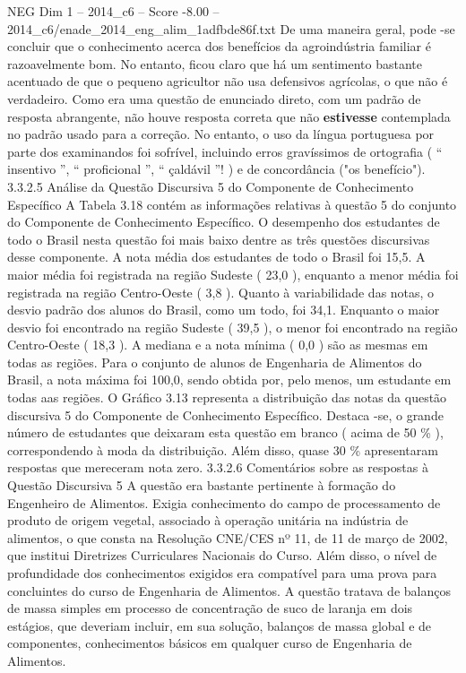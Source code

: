 \begin{textsample}{NEG Dim 1 – 2014\_c6 – Score -8.00 – 2014\_c6/enade\_2014\_eng\_alim\_1adfbde86f.txt}
De uma maneira geral, pode -se concluir que o conhecimento acerca dos benefícios da agroindústria familiar é razoavelmente bom.
No entanto, ficou claro que há um sentimento bastante acentuado de que o pequeno agricultor não usa defensivos agrícolas, o que não é verdadeiro.
Como era uma questão de enunciado direto, com um padrão de resposta abrangente, não houve resposta correta que não \textbf{estivesse} contemplada no padrão usado para a correção.
No entanto, o uso da língua portuguesa por parte dos examinandos foi sofrível, incluindo erros gravíssimos de ortografia ( “ insentivo ”, “ proficional ”, “ çaldávil ”! ) e de concordância ("os benefício"). 3.3.2.5 Análise da Questão Discursiva 5 do Componente de Conhecimento Específico A Tabela 3.18 contém as informações relativas à questão 5 do conjunto do Componente de Conhecimento Específico.
O desempenho dos estudantes de todo o Brasil nesta questão foi mais baixo dentre as três questões discursivas desse componente.
A nota média dos estudantes de todo o Brasil foi 15,5.
A maior média foi registrada na região Sudeste ( 23,0 ), enquanto a menor média foi registrada na região Centro-Oeste ( 3,8 ).
Quanto à variabilidade das notas, o desvio padrão dos alunos do Brasil, como um todo, foi 34,1.
Enquanto o maior desvio foi encontrado na região Sudeste ( 39,5 ), o menor foi encontrado na região Centro-Oeste ( 18,3 ).
A mediana e a nota mínima ( 0,0 ) são as mesmas em todas as regiões.
Para o conjunto de alunos de Engenharia de Alimentos do Brasil, a nota máxima foi 100,0, sendo obtida por, pelo menos, um estudante em todas aas regiões.
O Gráfico 3.13 representa a distribuição das notas da questão discursiva 5 do Componente de Conhecimento Específico.
Destaca -se, o grande número de estudantes que deixaram esta questão em branco ( acima de 50 \% ), correspondendo à moda da distribuição.
Além disso, quase 30 \% apresentaram respostas que mereceram nota zero. 3.3.2.6 Comentários sobre as respostas à Questão Discursiva 5 A questão era bastante pertinente à formação do Engenheiro de Alimentos.
Exigia conhecimento do campo de processamento de produto de origem vegetal, associado à operação unitária na indústria de alimentos, o que consta na Resolução CNE/CES nº 11, de 11 de março de 2002, que institui Diretrizes Curriculares Nacionais do Curso.
Além disso, o nível de profundidade dos conhecimentos exigidos era compatível para uma prova para concluintes do curso de Engenharia de Alimentos.
A questão tratava de balanços de massa simples em processo de concentração de suco de laranja em dois estágios, que deveriam incluir, em sua solução, balanços de massa global e de componentes, conhecimentos básicos em qualquer curso de Engenharia de Alimentos.

\end{textsample}
